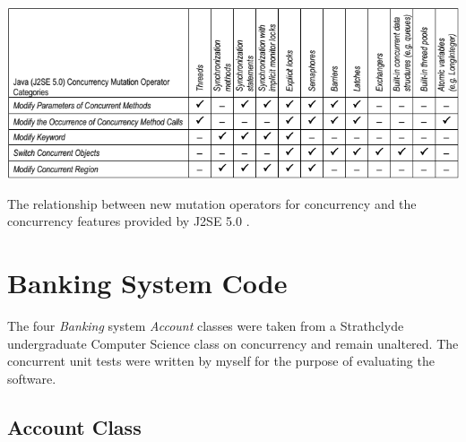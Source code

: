 \documentclass[a4paper,12pt]{article}
\begin{document}
\begin{table}
    \centering
    \includegraphics[scale = 0.85]{MO_features.png}
    \caption{The relationship between new mutation operators for concurrency and the concurrency features provided by J2SE 5.0 \citep{farchi03}.}
    \label{table:MO_features}
\end{table}

\newpage
\section{Banking System Code} \label{appendix:Banking System Code}

The four \textit{Banking} system \textit{Account} classes were taken from a Strathclyde undergraduate Computer Science class on concurrency and remain unaltered. The concurrent unit tests were written by myself for the purpose of evaluating the software.   

\subsection{Account Class} \label{appendix:Account}
\end{document}
